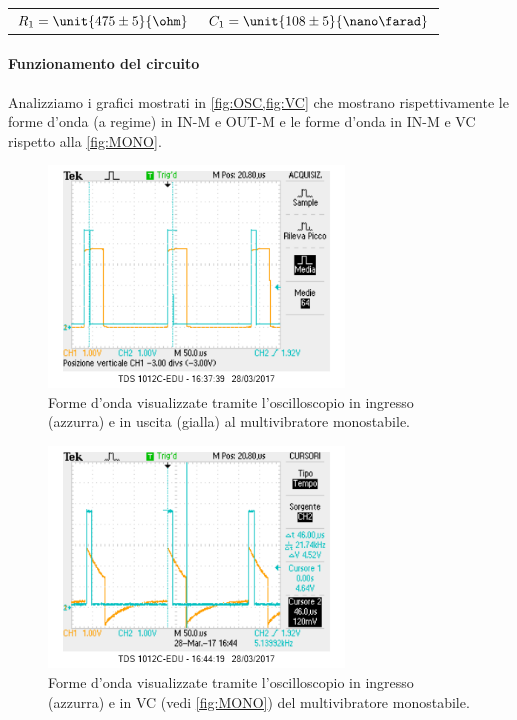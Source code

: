 \documentclass[a4paper,10pt]{article}
\begin{document}
\begin{table}[H]
	\centering
	\begin{tabular}{cc}
		$R_1 = \unit{475 \pm5}{\ohm}$ & $C_1 = \unit{108 \pm 5}{\nano\farad}$\\
	\end{tabular}
\end{table}




\paragraph{Funzionamento del circuito}
Analizziamo i grafici mostrati in \cref{fig:OSC,fig:VC} che mostrano rispettivamente le forme d'onda (a regime) in IN-M e OUT-M e le forme d'onda in IN-M e VC rispetto alla \cref{fig:MONO}.

\begin{figure}[H]
	\centering
	\includegraphics[width=0.7\textwidth]{../grafici/monostabileOSC.png}
	\caption{Forme d'onda visualizzate tramite l'oscilloscopio in ingresso (azzurra) e in uscita (gialla) al multivibratore monostabile.}
	\label{fig:OSC}
\end{figure}

\begin{figure}[H]
	\centering
	\includegraphics[width=0.7\textwidth]{../grafici/monostabileVC.png}
	\caption{Forme d'onda visualizzate tramite l'oscilloscopio in ingresso (azzurra) e in VC (vedi \cref{fig:MONO}) del multivibratore monostabile.}
	\label{fig:VC}
\end{figure}
\end{document}
